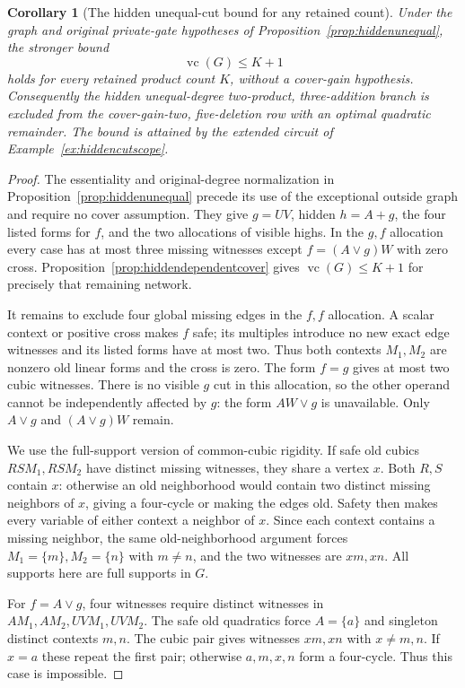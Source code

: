 \documentclass[11pt]{article}
\newcommand{\vc}{\operatorname{vc}}
\newtheorem{corollary}[theorem]{Corollary}
\theoremstyle{definition}
\theoremstyle{remark}
\begin{document}
\begin{corollary}[The hidden unequal-cut bound for any retained count]\label{cor:hiddenunequalany}
Under the graph and original private-gate hypotheses of Proposition~\ref{prop:hiddenunequal}, the stronger bound
\[
 \vc(G)\le K+1
\]
holds for every retained product count $K$, without a cover-gain hypothesis. Consequently the hidden unequal-degree two-product, three-addition branch is excluded from the cover-gain-two, five-deletion row with an optimal quadratic remainder. The bound is attained by the extended circuit of Example~\ref{ex:hiddencutscope}.
\end{corollary}
\begin{proof}
The essentiality and original-degree normalization in Proposition~\ref{prop:hiddenunequal} precede its use of the exceptional outside graph and require no cover assumption. They give $g=UV$, hidden $h=A+g$, the four listed forms for $f$, and the two allocations of visible highs. In the $g,f$ allocation every case has at most three missing witnesses except $f=(A\vee g)W$ with zero cross. Proposition~\ref{prop:hiddendependentcover} gives $\vc(G)\le K+1$ for precisely that remaining network.

It remains to exclude four global missing edges in the $f,f$ allocation. A scalar context or positive cross makes $f$ safe; its multiples introduce no new exact edge witnesses and its listed forms have at most two. Thus both contexts $M_1,M_2$ are nonzero old linear forms and the cross is zero. The form $f=g$ gives at most two cubic witnesses. There is no visible $g$ cut in this allocation, so the other operand cannot be independently affected by $g$: the form $AW\vee g$ is unavailable. Only $A\vee g$ and $(A\vee g)W$ remain.

We use the full-support version of common-cubic rigidity. If safe old cubics $RSM_1,RSM_2$ have distinct missing witnesses, they share a vertex $x$. Both $R,S$ contain $x$: otherwise an old neighborhood would contain two distinct missing neighbors of $x$, giving a four-cycle or making the edges old. Safety then makes every variable of either context a neighbor of $x$. Since each context contains a missing neighbor, the same old-neighborhood argument forces $M_1=\{m\},M_2=\{n\}$ with $m\ne n$, and the two witnesses are $xm,xn$. All supports here are full supports in $G$.

For $f=A\vee g$, four witnesses require distinct witnesses in $AM_1,AM_2,UVM_1,UVM_2$. The safe old quadratics force $A=\{a\}$ and singleton distinct contexts $m,n$. The cubic pair gives witnesses $xm,xn$ with $x\ne m,n$. If $x=a$ these repeat the first pair; otherwise $a,m,x,n$ form a four-cycle. Thus this case is impossible.


\end{proof}
\end{document}
